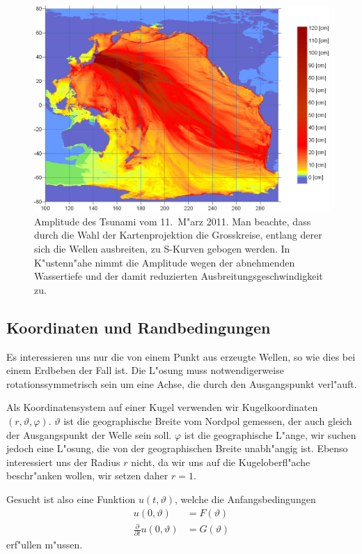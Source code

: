 \begin{figure}
\begin{center}
\includegraphics[width=\hsize]{graphics/sendaienergy}
\end{center}
\caption{Amplitude des Tsunami vom 11.~M"arz 2011.
Man beachte, dass durch die Wahl der Kartenprojektion 
die Grosskreise, entlang derer sich die Wellen ausbreiten,
zu S-Kurven gebogen werden. In K"ustenn"ahe nimmt die
Amplitude wegen der abnehmenden Wassertiefe und der damit
reduzierten Ausbreitungsgeschwindigkeit zu.
\label{tsunamienergie}}
\end{figure}


\subsection{Koordinaten und Randbedingungen}
Es interessieren uns nur die von einem Punkt aus erzeugte Wellen,
so wie dies bei einem Erdbeben der Fall ist. Die L"osung muss
notwendigerweise rotationssymmetrisch sein um eine Achse, die
durch den Ausgangspunkt verl"auft. 

Als Koordinatensystem auf einer Kugel verwenden wir Kugelkoordinaten
$(r,\vartheta,\varphi)$. $\vartheta$ ist die geographische Breite
vom Nordpol gemessen, der auch gleich der Ausgangspunkt der
Welle sein soll. $\varphi$ ist die geographische L"ange, wir
suchen jedoch eine L"osung, die von der geographischen Breite
unabh"angig ist. Ebenso interessiert uns der Radius $r$ nicht,
da wir uns auf die Kugeloberfl"ache beschr"anken wollen, wir
setzen daher $r=1$.

Gesucht ist also eine Funktion $u(t,\vartheta)$, welche die
Anfangsbedingungen
\begin{align*}
u(0,\vartheta)&=F(\vartheta)\\
\frac{\partial}{\partial t}u(0,\vartheta)&=G(\vartheta)
\end{align*}
erf"ullen m"ussen.

